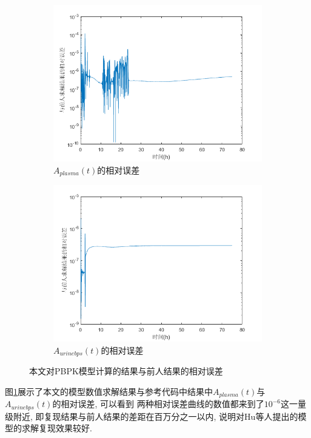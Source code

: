 \documentclass[a4paper,punct=banjiao,twoside]{ctexrep}
\theoremstyle{plain}
\theoremstyle{definition}
\theoremstyle{remark}
\begin{document}
\begin{figure}[H]
  \centering
  \begin{subfigure}{0.6\textwidth}
    \centering
    \includegraphics[scale=0.5]{./figs/p9_1.png}
    \caption{$A_{plasma}(t)$的相对误差}
  \end{subfigure}
  \begin{subfigure}{0.6\textwidth}
    \centering
    \includegraphics[scale=0.5]{./figs/p9_2.png}
    \caption{$A_{urinebps}(t)$的相对误差}
  \end{subfigure}
  \caption{本文对PBPK模型计算的结果与前人结果的相对误差}
  \label{PBPK模型结果对比}
\end{figure}


图\ref{PBPK模型结果对比}展示了本文的模型数值求解结果与参考代码\cite{11}中结果中$A_{plasma}(t)$与$A_{urinebps}(t)$的相对误差, 可以看到
两种相对误差曲线的数值都来到了$10^{-6}$这一量级附近, 即复现结果与前人结果的差距在百万分之一以内, 说明对Hu等人\cite{11}提出的模型的求解复现效果较好.
\end{document}

